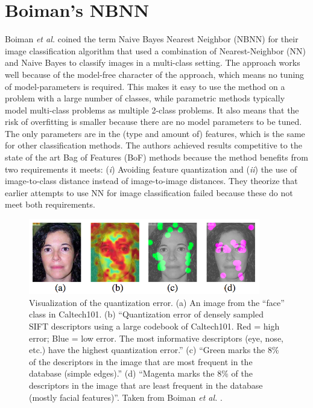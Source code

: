 \section{Boiman's NBNN} %
\label{sub:boiman_s_nbnn}
Boiman \emph{et al.} \cite{boiman2008defense} coined the term Naive Bayes Nearest Neighbor (NBNN) for their image classification algorithm that used a combination of Nearest-Neighbor (NN) and Naive Bayes to classify images in a multi-class setting. The approach works well because of the model-free character of the approach, which means no tuning of model-parameters is required. This makes it easy to use the method on a problem with a large number of classes, while parametric methods typically model multi-class problems as multiple 2-class problems. It also means that the risk of overfitting is smaller because there are no model parameters to be tuned. The only parameters are in the (type and amount of) features, which is the same for other classification methods. The authors achieved results competitive to the state of the art Bag of Features (BoF) methods because the method benefits from two requirements it meets: (\emph{i}) Avoiding feature quantization and (\emph{ii}) the use of image-to-class distance instead of image-to-image distances. They theorize that earlier attempts to use NN \cite{berg2005shape, zhang2006svm} for image classification failed because these do not meet both requirements.

\begin{figure}[hbt]
    \centering
    \includegraphics[width=0.9\textwidth]{QuantizationError}
    \caption{Visualization of the quantization error. (a) An image from the ``face'' class in Caltech101. \cite{caltech101} (b) ``Quantization error of densely sampled SIFT descriptors using a large codebook of Caltech101. Red = high error; Blue = low error. The most informative descriptors (eye, nose, etc.) have the highest quantization error.'' (c) ``Green marks the 8\% of the descriptors in the image that are most frequent in the database (simple edges).'' (d) ``Magenta marks the 8\% of the descriptors in the image that are least frequent in the database (mostly facial features)''. Taken from Boiman \emph{et al.} \cite{boiman2008defense}.}
    \label{fig:quantization_error}
\end{figure}

